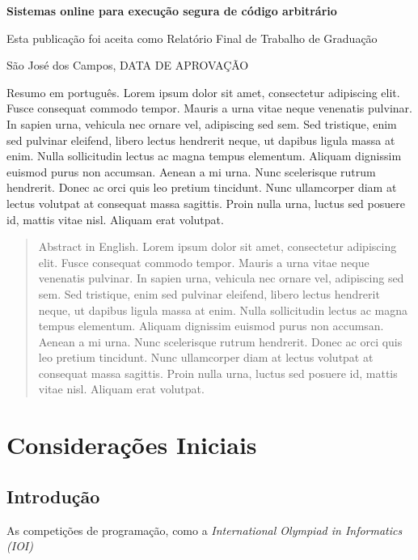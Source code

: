\documentclass[times,ruledheader]{abnt}
\begin{document}
\folhaderosto

\begin{folhadeaprovacao}
	\setlength\ABNTsignwidth{10cm}
	\setlength\ABNTsignthickness{0.4pt}
	\setlength\ABNTsignskip{3cm}
	\begin{center}
		\textbf{Sistemas online para execução segura de código arbitrário}
		
		Esta publicação foi aceita como Relatório Final de Trabalho de Graduação
	\end{center}
	
	
	\vfill
	\begin{center}
		São José dos Campos, DATA DE APROVAÇÃO
	\end{center}
\end{folhadeaprovacao}

\begin{resumo}
Resumo em português. Lorem ipsum dolor sit amet, consectetur adipiscing elit. Fusce consequat commodo tempor. Mauris a urna vitae neque venenatis pulvinar. In sapien urna, vehicula nec ornare vel, adipiscing sed sem. Sed tristique, enim sed pulvinar eleifend, libero lectus hendrerit neque, ut dapibus ligula massa at enim. Nulla sollicitudin lectus ac magna tempus elementum. Aliquam dignissim euismod purus non accumsan. Aenean a mi urna. Nunc scelerisque rutrum hendrerit. Donec ac orci quis leo pretium tincidunt. Nunc ullamcorper diam at lectus volutpat at consequat massa sagittis. Proin nulla urna, luctus sed posuere id, mattis vitae nisl. Aliquam erat volutpat.
\end{resumo}

\begin{abstract}
Abstract in English. Lorem ipsum dolor sit amet, consectetur adipiscing elit. Fusce consequat commodo tempor. Mauris a urna vitae neque venenatis pulvinar. In sapien urna, vehicula nec ornare vel, adipiscing sed sem. Sed tristique, enim sed pulvinar eleifend, libero lectus hendrerit neque, ut dapibus ligula massa at enim. Nulla sollicitudin lectus ac magna tempus elementum. Aliquam dignissim euismod purus non accumsan. Aenean a mi urna. Nunc scelerisque rutrum hendrerit. Donec ac orci quis leo pretium tincidunt. Nunc ullamcorper diam at lectus volutpat at consequat massa sagittis. Proin nulla urna, luctus sed posuere id, mattis vitae nisl. Aliquam erat volutpat.
\end{abstract}

\tableofcontents

\listoffigures

\listoftables

\chapter{Considerações Iniciais}

\section{Introdução}

As competições de programação, como a \emph{International Olympiad in Informatics (IOI)} \cite{ioinformatics}


\end{document}

